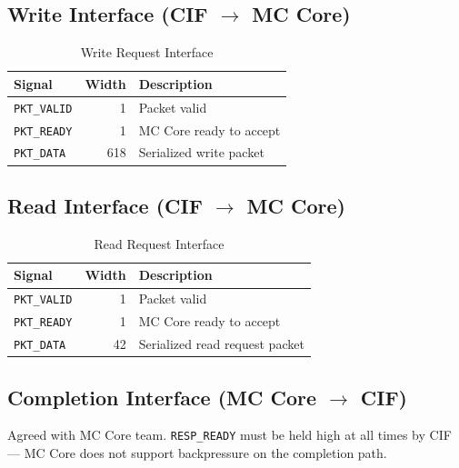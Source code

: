 \subsection{Write Interface (CIF \texorpdfstring{$\rightarrow$}{->} MC Core)}

\begin{table}[h]
\centering
\begin{tabular}{lrl}
\toprule
\textbf{Signal} & \textbf{Width} & \textbf{Description} \\
\midrule
\texttt{PKT\_VALID} & 1   & Packet valid \\
\texttt{PKT\_READY} & 1   & MC Core ready to accept \\
\texttt{PKT\_DATA}  & 618 & Serialized write packet \\
\bottomrule
\end{tabular}
\caption{Write Request Interface}
\end{table}

\subsection{Read Interface (CIF \texorpdfstring{$\rightarrow$}{->} MC Core)}

\begin{table}[h]
\centering
\begin{tabular}{lrl}
\toprule
\textbf{Signal} & \textbf{Width} & \textbf{Description} \\
\midrule
\texttt{PKT\_VALID} & 1  & Packet valid \\
\texttt{PKT\_READY} & 1  & MC Core ready to accept \\
\texttt{PKT\_DATA}  & 42 & Serialized read request packet \\
\bottomrule
\end{tabular}
\caption{Read Request Interface}
\end{table}

\subsection{Completion Interface (MC Core \texorpdfstring{$\rightarrow$}{->} CIF)}

Agreed with MC Core team. \texttt{RESP\_READY} must be held high at all times by CIF — MC Core does not support backpressure on the completion path.

